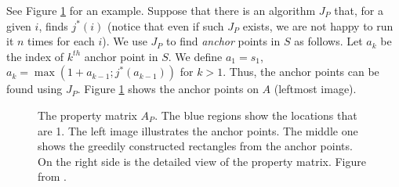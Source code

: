 \documentclass{article}
\begin{document}
See Figure \ref{fig:property_matrix} for an example. Suppose that
there is an algorithm $J_P$ that, for a given $i$, finds $j^*(i)$
(notice that even if such $J_P$ exists, we are not happy to run it
$n$ times for each $i$). We use $J_P$ to find \textit{anchor} points
in $S$ as follows. Let $a_k$ be the index of $k^{th}$ anchor point
in $S$. We define $a_1 = s_1$, $a_k = \max(1 + a_{k-1}; j^*(a_{k-1}))$
for $k > 1$. Thus, the anchor points can be found using $J_P$.
Figure \ref{fig:property_matrix} shows the anchor points on $A$
(leftmost image).

\begin{figure}
    \centering
    \label{fig:property_matrix}
    \caption{The property matrix $A_P$. The blue regions show the
    locations that are 1. The left image illustrates the anchor
    points. The middle one shows the greedily constructed rectangles
    from the anchor points. On the right side is the detailed view
    of the property matrix. Figure from \cite{bokal2015}.}
\end{figure}
\end{document}
